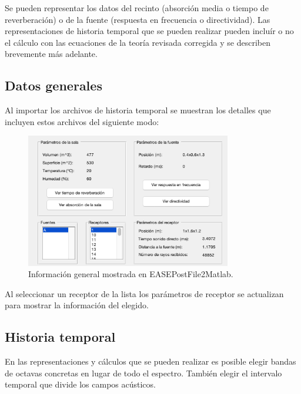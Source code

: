 Se pueden representar los datos del recinto (absorción media o tiempo de reverberación) o de la fuente (respuesta en frecuencia o directividad). Las representaciones de historia temporal que se pueden realizar pueden incluír o no el cálculo con las ecuaciones de la teoría revisada corregida y se describen brevemente más adelante.

\subsection{Datos generales}
Al importar los archivos de historia temporal se muestran los detalles que incluyen estos archivos del siguiente modo:

\begin{figure}[ht]
    \centering
    \includegraphics[width=0.8\textwidth]{archivos/capturas/generalease}
    \caption{Información general mostrada en EASEPostFile2Matlab.}
\end{figure}
\FloatBarrier

Al seleccionar un receptor de la lista los parámetros de receptor se actualizan para mostrar la información del elegido.

\subsection{Historia temporal}
En las representaciones y cálculos que se pueden realizar es posible elegir bandas de octavas concretas en lugar de todo el espectro. También elegir el intervalo temporal que divide los campos acústicos.

